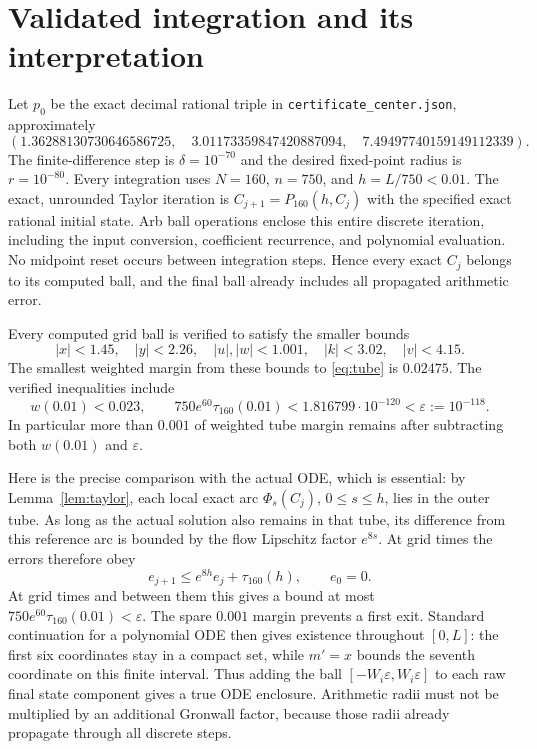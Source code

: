 \documentclass[11pt]{article}
\begin{document}
\section{Validated integration and its interpretation}
Let $p_0$ be the exact decimal rational triple in
\nolinkurl{certificate_center.json}, approximately
\[
 (1.36288130730646586725,\quad
  3.01173359847420887094,\quad
  7.49497740159149112339).
\]
The finite-difference step is $\delta=10^{-70}$ and the desired fixed-point
radius is $r=10^{-80}$. Every integration uses $N=160$, $n=750$,
and $h=L/750<0.01$. The exact, unrounded Taylor iteration is
$C_{j+1}=P_{160}(h,C_j)$ with the specified exact rational initial state.
Arb ball operations enclose this entire discrete iteration, including
the input conversion, coefficient recurrence, and polynomial evaluation.
No midpoint reset occurs between integration steps. Hence every exact
$C_j$ belongs to its computed ball, and the final ball already includes
all propagated arithmetic error.

Every computed grid ball is verified to satisfy the smaller bounds
\begin{equation}\label{eq:inner}
 |x|<1.45,\quad |y|<2.26,\quad |u|,|w|<1.001,
 \quad |k|<3.02,\quad |v|<4.15.
\end{equation}
The smallest weighted margin from these bounds to \eqref{eq:tube} is
$0.02475$. The verified inequalities include
\begin{equation}\label{eq:globalerror}
 w(0.01)<0.023,\qquad
 750e^{60}\tau_{160}(0.01)
 <1.816799\cdot10^{-120}<\varepsilon:=10^{-118}.
\end{equation}
In particular more than $0.001$ of weighted tube margin remains after
subtracting both $w(0.01)$ and $\varepsilon$.

Here is the precise comparison with the actual ODE, which is essential:
by Lemma~\ref{lem:taylor}, each local exact arc $\Phi_s(C_j)$,
$0\le s\le h$, lies in the outer tube. As long as the actual solution
also remains in that tube, its difference from this reference arc is
bounded by the flow Lipschitz factor $e^{8s}$. At grid times the errors
therefore obey
\[
 e_{j+1}\le e^{8h}e_j+\tau_{160}(h),\qquad e_0=0.
\]
At grid times and between them this gives a bound at most
$750e^{60}\tau_{160}(0.01)<\varepsilon$. The spare $0.001$ margin
prevents a first exit. Standard continuation for a polynomial ODE then
gives existence throughout $[0,L]$: the first six coordinates stay in a
compact set, while $m'=x$ bounds the seventh coordinate on this finite
interval. Thus adding the ball $[-W_i\varepsilon,W_i\varepsilon]$ to
each raw final state component gives a true ODE enclosure.
Arithmetic radii must not be multiplied by an additional Gronwall factor,
because those radii already propagate through all discrete steps.
\end{document}
